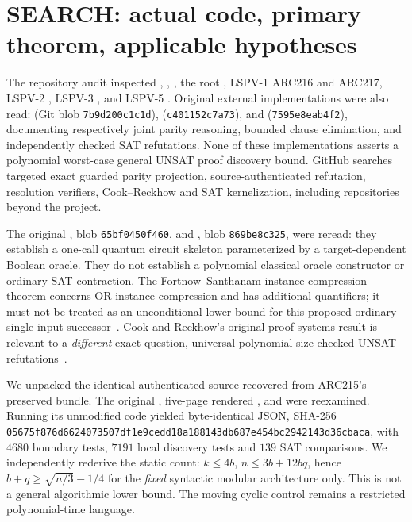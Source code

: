 \documentclass[11pt]{article}
\begin{document}
\section{SEARCH: actual code, primary theorem, applicable hypotheses}
The repository audit inspected , , , the root , LSPV-1 ARC216 and ARC217, LSPV-2 , LSPV-3 , and LSPV-5 . Original external implementations were also read:  (Git blob \texttt{7b9d200c1c1d}),  (\texttt{c401152c7a73}), and  (\texttt{7595e8eab4f2}), documenting respectively joint parity reasoning, bounded clause elimination, and independently checked SAT refutations. None of these implementations asserts a polynomial worst-case general UNSAT proof discovery bound. GitHub searches targeted exact guarded parity projection, source-authenticated refutation, resolution verifiers, Cook--Reckhow and SAT kernelization, including repositories beyond the project.

The original , blob \texttt{65bf0450f460}, and , blob \texttt{869be8c325}, were reread: they establish a one-call quantum circuit skeleton parameterized by a target-dependent Boolean oracle. They do not establish a polynomial classical oracle constructor or ordinary SAT contraction. The Fortnow--Santhanam instance compression theorem concerns OR-instance compression and has additional quantifiers; it must not be treated as an unconditional lower bound for this proposed ordinary single-input successor~\cite{fortnow2008}. Cook and Reckhow's original proof-systems result is relevant to a \emph{different} exact question, universal polynomial-size checked UNSAT refutations~\cite{cook1979}.

We unpacked the identical authenticated  source recovered from ARC215's preserved bundle. The original , five-page rendered ,  and  were reexamined. Running its unmodified code yielded byte-identical JSON, SHA-256 \texttt{05675f876d6624073507df1e9cedd18a188143db687e454bc2942143d36cbaca}, with $4680$ boundary tests, $7191$ local discovery tests and $139$ SAT comparisons. We independently rederive the static count: $k\le 4b$, $n\le3b+12bq$, hence $b+q\ge\sqrt{n/3}-1/4$ for the \emph{fixed} syntactic modular architecture only. This is not a general algorithmic lower bound. The moving cyclic control remains a restricted polynomial-time language.
\end{document}

